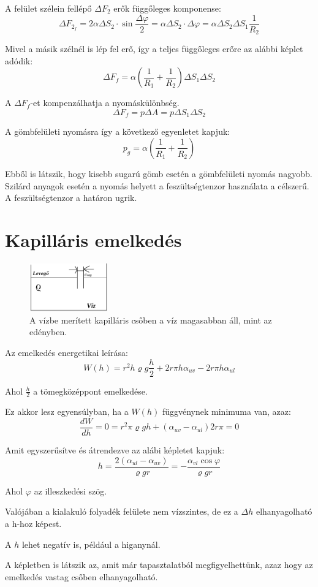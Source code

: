 \documentclass[a4paper,titlepage,12pt]{article}
\begin{document}
\noindent
A felület szélein fellépő $\Delta F_{2}$ erők függőleges komponense: $$ \Delta F_{2_{f}} =2\alpha\Delta S_{2}\cdot\sin{\frac{\Delta\varphi}{2}}=\alpha\Delta S_{2}\cdot\Delta\varphi=\alpha\Delta S_{2}\Delta S_{1} \frac{1}{R_2} $$

\noindent
Mivel a másik szélnél is lép fel erő, így a teljes függőleges erőre az alábbi képlet adódik: $$ \Delta F_{f}=\alpha(\frac{1}{R_{1}}+\frac{1}{R_{2}})\Delta S_{1}\Delta S_{2} $$

\noindent
A $\Delta F_{f}$-et kompenzálhatja a nyomáskülönbség. $$ \Delta F_{f}=p\Delta A=p\Delta S_{1}\Delta S_{2}$$

\noindent
A gömbfelületi nyomásra így a következő egyenletet kapjuk: $$p_{g}=\alpha(\frac{1}{R_{1}}+\frac{1}{R_{2}}) $$

\noindent
Ebből is látszik, hogy kisebb sugarú gömb esetén a gömbfelületi nyomás nagyobb. Szilárd anyagok esetén a nyomás helyett a feszültségtenzor használata a célszerű. A feszültségtenzor a határon ugrik.

\part*{Kapilláris emelkedés }

\begin{figure}[H]
	\begin{center}
		\includegraphics[width=0.3\textwidth]{tetel74.png}
		\caption{A vízbe merített kapilláris csőben a víz magasabban áll, mint az edényben.}
	\end{center}
\end{figure}

\noindent
Az emelkedés energetikai leírása: $$ W(h)=r^{2}h\varrho g \frac{h}{2}+2r\pi h\alpha_{uv}-2r\pi h\alpha_{ul}$$

\noindent
Ahol $\frac{h}{2}$ a tömegközéppont emelkedése.

\noindent
Ez akkor lesz egyensúlyban, ha a $W(h)$ függvénynek minimuma van, azaz: $$\frac{dW}{dh}=0=r^2\pi\varrho gh+(\alpha_{uv}-\alpha_{ul})2r\pi=0 $$ 

\noindent
Amit egyszerűsítve és átrendezve az alábi képletet kapjuk: $$h=\frac{2(\alpha_{ul}-\alpha_{uv})}{\varrho gr}=-\frac{\alpha_{vl}\cos{\varphi}}{\varrho gr}$$

\noindent
Ahol $\varphi$ az illeszkedési szög.

\noindent
Valójában a kialakuló folyadék felülete nem vízszintes, de ez a $\Delta h$ elhanyagolható a h-hoz képest.

\noindent
A $h$ lehet negatív is, például a higanynál.

\noindent
A képletben is látszik az, amit már tapasztalatból megfigyelhettünk, azaz hogy az emelkedés vastag csőben elhanyagolható.
\end{document}
